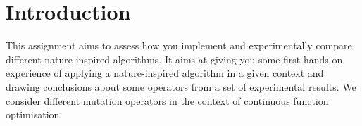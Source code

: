 \documentclass{article}
\begin{document}
    \section{Introduction}
		This assignment aims to assess how you implement and experimentally compare different nature-inspired
algorithms. It aims at giving you some first hands-on experience of applying a nature-inspired
algorithm in a given context and drawing conclusions about some operators from a set
of experimental results. We consider different mutation operators in the context of continuous
function optimisation.
\end{document}

